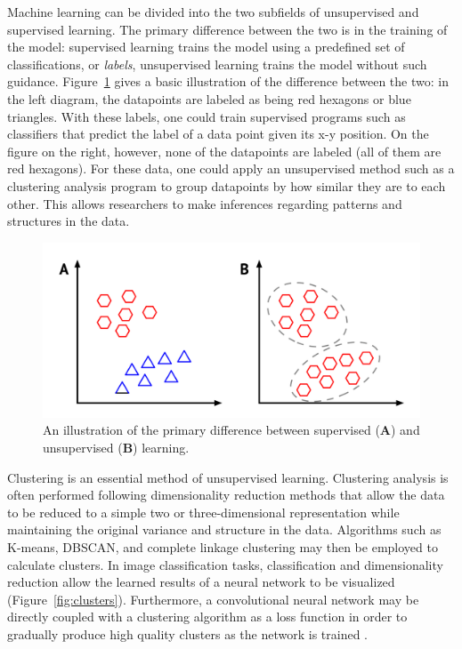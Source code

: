 \documentclass[12pt,oneside,onecolumn,a4paper]{article}
\begin{document}
Machine learning can be divided into the two subfields of unsupervised and supervised learning. The primary difference between the two is in the training of the model: supervised learning trains the model using a predefined set of classifications, or \textit{labels}, unsupervised learning trains the model without such guidance. Figure~\ref{fig:super} gives a basic illustration of the difference between the two:
in the left diagram, the datapoints are labeled as being red hexagons or blue triangles. With these labels, one could train supervised programs such as classifiers that predict the label of a data point given its x-y position. On the figure on the right, however, none of the datapoints are labeled (all of them are red hexagons). For these data, one could apply an unsupervised method such as a clustering analysis program to group datapoints by how similar they are to each other. This allows researchers to make inferences regarding patterns and structures in the data.

\begin{figure}[H]
\begin{center}
\includegraphics[width=0.8\columnwidth]{figures/learningtypes}
\caption{An illustration of the primary difference between supervised (\textbf{A}) and unsupervised (\textbf{B}) learning.\label{fig:super}
}
\end{center}
\end{figure}

Clustering is an essential method of unsupervised learning. Clustering analysis is often performed following dimensionality reduction methods that allow the data to be reduced to a simple two or three-dimensional representation while maintaining the original variance and structure in the data. Algorithms such as K-means, DBSCAN, and complete linkage clustering may then be employed to calculate clusters. In image classification tasks, classification and dimensionality reduction allow the learned results of a neural network to be visualized (Figure~\ref{fig:clusters}). Furthermore, a convolutional neural network may be directly coupled with a clustering algorithm as a loss function in order to gradually produce high quality clusters as the network is trained \citep{yangCVPR2016joint}.
\end{document}
